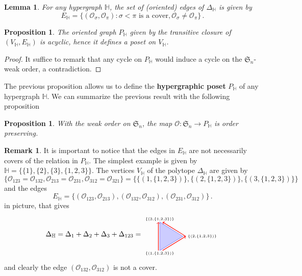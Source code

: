\documentclass[reqno]{amsart}
\newtheorem{proposition}[theorem]{Proposition}
\newtheorem{lemma}[theorem]{Lemma}
\theoremstyle{definition}
\newtheorem{remark}[theorem]{Remark}
\newcommand{\defn}[1]{\textbf{\textsf{\color{PineGreen} #1}}} %
\newcommand{\fS}{\mathfrak{S}} %
\newcommand{\Or}{\mathcal O}  %
\newcommand{\HH}{\mathbb H}  %
\begin{document}
\begin{lemma}\label{lem:Hedges}
For any hypergraph $\HH$, the set of (oriented) edges of $\Delta_{\HH}$ is given by 
 $$E_{\HH}=\{(\Or_\sigma,\Or_\pi): \sigma<\pi \text{ is a cover}, \Or_\sigma\ne\Or_\pi\}\,.$$
\end{lemma}

\begin{proposition}\label{prop:PHisOrder}
The oriented graph $P_{\HH}$ given by the transitive closure of $(V_{\HH},E_{\HH})$ is acyclic, hence it defines a poset on $V_{\HH}$.
\end{proposition}

\begin{proof} It suffice to remark that any cycle on $P_{\HH}$ would induce a cycle on the $\fS_n$-weak order, a contradiction.
\end{proof}

The previous proposition allows us to define the \defn{hypergraphic poset} $P_{\HH}$ of any hypergraph $\HH$.  
We can summarize the previous result with the following proposition

\begin{proposition}\label{prop:WeakToP}
With the weak order on $\fS_n$, the map $\Or \colon \fS_n \to P_{\HH}$ is order preserving.
\end{proposition}



\begin{remark}\label{rem:EdgeNotCover}
It is important to notice that the edges in $E_{\HH}$ are not necessarily covers of the relation in $P_{\HH}$. The simplest example is given by $\HH=\big\{\{1\},\{2\},\{3\},\{1,2,3\}\big\}$.
The vertices $V_{\HH}$ of the polytope $\Delta_{\HH}$ are given by
	$$\Big\{ \Or_{123}=\Or_{132}, \Or_{213}=\Or_{231}, \Or_{312}=\Or_{321}\Big\}= \Big\{ \big\{(1,\{1,2,3\})\big\},\big\{(2,\{1,2,3\})\big\},\big\{(3,\{1,2,3\})\big\}\Big\}$$
and the edges
	$$ E_{\HH}=\big\{ (\Or_{123},\Or_{213}),(\Or_{132},\Or_{312}),(\Or_{231}, \Or_{312})\big\}\,.$$
in picture, that gives
$$\Delta_\HH=\Delta_1+\Delta_2+\Delta_3+\Delta_{123}=
\begin{tikzpicture}[scale=.7,baseline=.0cm]
	\node (a) at (0,-1.2) {$\scriptscriptstyle \{(1,\{1,2,3\})\}$};
	\node (b) at (3,0) {$\scriptscriptstyle \{(2,\{1,2,3\})\}$};
	\node (c) at (0,1.2) {$\scriptscriptstyle \{(3,\{1,2,3\})\}$};
	\draw [color=blue!40,thick,fill=blue!20] (0,-1)--(0,1)--(1.632,0)--(0,-1) ; 
	\draw [color=red,thick,->] (-.1,-1)--(-.1,1); 
	\draw [color=red,thick,->] (1.832,0)--(.2,1); 
	\draw [color=red,thick,->] (.2,-1)--(1.832,0); 
\end{tikzpicture}
$$
and clearly the edge $(\Or_{132},\Or_{312})$ is not a cover. 
\end{remark}
\end{document}
